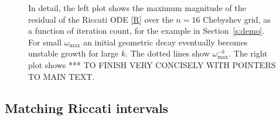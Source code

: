 \documentclass[10pt]{article}
\newcommand{\om}{\omega}
\newcommand{\AB}[1]{{\color{orange}#1}}
\begin{document}
\begin{figure}[tb]
{      In detail, the left plot shows the maximum magnitude of the residual
      of the Riccati ODE \eqref{R} over the
      $n=16$ Chebyshev grid, as a function of iteration count,
      for the example in Section~\ref{s:demo}.
      For small $\om_{\text{max}}$ an initial geometric decay eventually becomes
      unstable growth for large $k$. The dotted lines show $\om_{\text{max}}^{-k}$.
      The right plot shows *** TO FINISH VERY CONCISELY WITH POINTERS TO
      MAIN TEXT.
      }
\end{figure}    %



\subsection{Matching Riccati intervals}
\end{document}
